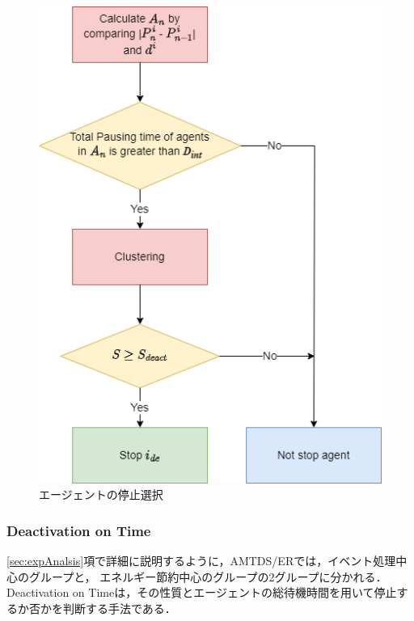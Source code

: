 \documentclass[12pt,a4j,twoside]{jarticle}
\begin{document}
  \begin{figure}
    \centering
    \includegraphics[width=0.6\hsize]{figures/Flowchart_stop_E.png}
    \caption{エージェントの停止選択}
    \label{fig:flowchart_stop}
  \end{figure}


  \subsubsection{Deactivation on Time}\label{sec:TimeStop}
  \ref{sec:expAnalsis}項で詳細に説明するように，AMTDS/ERでは，イベント処理中心のグループと，
  エネルギー節約中心のグループの2グループに分かれる．
  Deactivation on Timeは，その性質とエージェントの総待機時間を用いて停止するか否かを判断する手法である．
  \par
  
\end{document}
